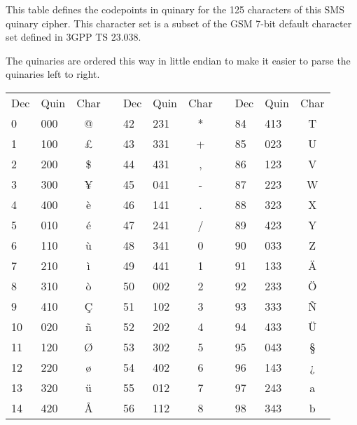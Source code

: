 \documentclass{article}
\begin{document}
\label{a1}

This table defines the codepoints in quinary for the 125 characters of this
SMS quinary cipher. This character set is a subset of the GSM 7-bit default
character set defined in 3GPP TS 23.038.

The quinaries are ordered this way in little endian to make it easier to parse the
quinaries left to right.

\begin{longtable}{|l|l|c|c|l|l|c|c|l|l|c|}
  \cline{1-3}
  \cline{5-7}
  \cline{9-11}
  Dec & Quin & Char & & Dec & Quin& Char& & Dec& Quin& Char\\
  \cline{1-3}
  \cline{5-7}
  \cline{9-11}
  0 & 000 & @ & & 42 & 231 & * & & 84 & 413 & T \\
  \cline{1-3}
  \cline{5-7}
  \cline{9-11}
  1 & 100 & £ & & 43 & 331 & + & & 85 & 023 & U \\
  \cline{1-3}
  \cline{5-7}
  \cline{9-11}
  2 & 200 & \$ & & 44 & 431 & , & & 86 & 123 & V \\
  \cline{1-3}
  \cline{5-7}
  \cline{9-11}
  3 & 300 & ¥ & & 45 & 041 & - & & 87 & 223 & W \\
  \cline{1-3}
  \cline{5-7}
  \cline{9-11}
  4 & 400 & è & & 46 & 141 & . & & 88 & 323 & X \\
  \cline{1-3}
  \cline{5-7}
  \cline{9-11}
  5 & 010 & é & & 47 & 241 & / & & 89 & 423 & Y \\
  \cline{1-3}
  \cline{5-7}
  \cline{9-11}
  6 & 110 & ù & & 48 & 341 & 0 & & 90 & 033 & Z \\
  \cline{1-3}
  \cline{5-7}
  \cline{9-11}
  7 & 210 & ì & & 49 & 441 & 1 & & 91 & 133 & Ä \\
  \cline{1-3}
  \cline{5-7}
  \cline{9-11}
  8 & 310 & ò & & 50 & 002 & 2 & & 92 & 233 & Ö \\
  \cline{1-3}
  \cline{5-7}
  \cline{9-11}
  9 & 410 & Ç & & 51 & 102 & 3 & & 93 & 333 & Ñ \\
  \cline{1-3}
  \cline{5-7}
  \cline{9-11}
  10 & 020 & ñ & & 52 & 202 & 4 & & 94 & 433 & Ü \\
  \cline{1-3}
  \cline{5-7}
  \cline{9-11}
  11 & 120 & Ø & & 53 & 302 & 5 & & 95 & 043 & § \\
  \cline{1-3}
  \cline{5-7}
  \cline{9-11}
  12 & 220 & ø & & 54 & 402 & 6 & & 96 & 143 & ¿ \\
  \cline{1-3}
  \cline{5-7}
  \cline{9-11}
  13 & 320 & ü & & 55 & 012 & 7 & & 97 & 243 & a \\
  \cline{1-3}
  \cline{5-7}
  \cline{9-11}
  14 & 420 & Å & & 56 & 112 & 8 & & 98 & 343 & b \\

\end{longtable}
\end{document}
